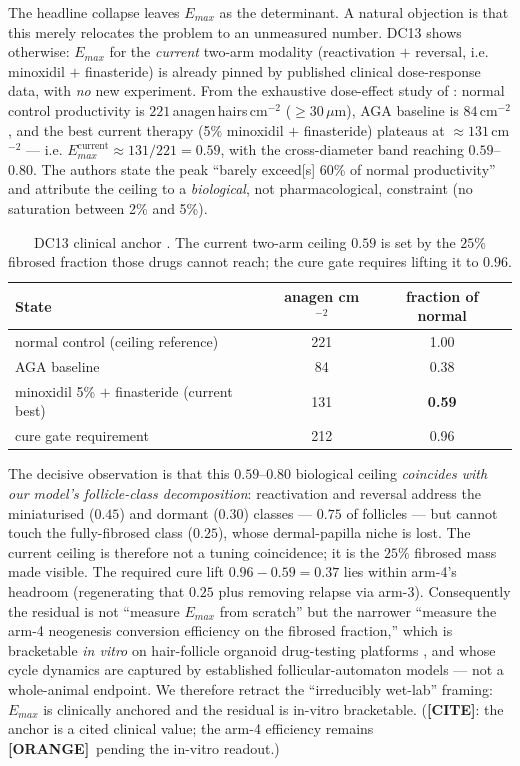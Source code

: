 \documentclass[11pt,a4paper]{article}
\newcommand{\tierbadge}[2]{\textcolor{#1}{\textbf{[#2]}}}
\providecommand{\tierYellow}{\tierbadge{yellow!50!black}{CITE}}
\providecommand{\tierOrange}{\tierbadge{orange!80!black}{ORANGE}}
\begin{document}
The headline collapse leaves $E_{max}$ as the determinant. A natural objection is
that this merely relocates the problem to an unmeasured number. DC13 shows
otherwise: $E_{max}$ for the \emph{current} two-arm modality (reactivation $+$
reversal, i.e. minoxidil $+$ finasteride) is already pinned by published clinical
dose-response data, with \emph{no} new experiment. From the exhaustive
dose-effect study of \citet{vanneste2020}: normal control productivity is
$221$\,anagen\,hairs\,cm$^{-2}$ ($\geq 30\,\mu$m), AGA baseline is
$84$\,cm$^{-2}$, and the best current therapy (5\% minoxidil $+$ finasteride)
plateaus at $\approx 131$\,cm$^{-2}$ --- i.e. $E_{max}^{\text{current}}\approx
131/221 = 0.59$, with the cross-diameter band reaching $0.59$--$0.80$. The authors
state the peak ``barely exceed[s] 60\% of normal productivity'' and attribute the
ceiling to a \emph{biological}, not pharmacological, constraint (no saturation
between 2\% and 5\%).

\begin{table}[h]
\centering\small
\begin{tabular}{lcc}
\toprule
\textbf{State} & \textbf{anagen cm$^{-2}$} & \textbf{fraction of normal} \\
\midrule
normal control (ceiling reference) & 221 & 1.00 \\
AGA baseline                       &  84 & 0.38 \\
minoxidil 5\% $+$ finasteride (current best) & 131 & \textbf{0.59} \\
\midrule
cure gate requirement              & 212 & 0.96 \\
\bottomrule
\end{tabular}
\caption{DC13 clinical anchor \citep{vanneste2020}. The current two-arm ceiling
$0.59$ is set by the $25\%$ fibrosed fraction those drugs cannot reach; the cure
gate requires lifting it to $0.96$.}
\label{tab:dc13}
\end{table}

\noindent The decisive observation is that this $0.59$--$0.80$ biological ceiling
\emph{coincides with our model's follicle-class decomposition}: reactivation and
reversal address the miniaturised ($0.45$) and dormant ($0.30$) classes ---
$0.75$ of follicles --- but cannot touch the fully-fibrosed class ($0.25$), whose
dermal-papilla niche is lost. The current ceiling is therefore not a tuning
coincidence; it is the $25\%$ fibrosed mass made visible. The required cure lift
$0.96-0.59 = 0.37$ lies within arm-4's headroom (regenerating that $0.25$ plus
removing relapse via arm-3). Consequently the residual is not ``measure $E_{max}$
from scratch'' but the narrower ``measure the arm-4 neogenesis conversion
efficiency on the fibrosed fraction,'' which is bracketable \emph{in vitro} on
hair-follicle organoid drug-testing platforms \citep{vitroDrugTest2023}, and whose
cycle dynamics are captured by established follicular-automaton models
\citep{halloy2000} --- not a whole-animal endpoint. We therefore retract the
``irreducibly wet-lab'' framing: $E_{max}$ is clinically anchored and the residual
is in-vitro bracketable. (\tierYellow: the anchor is a cited clinical value; the
arm-4 efficiency remains \tierOrange\ pending the in-vitro readout.)
\end{document}
